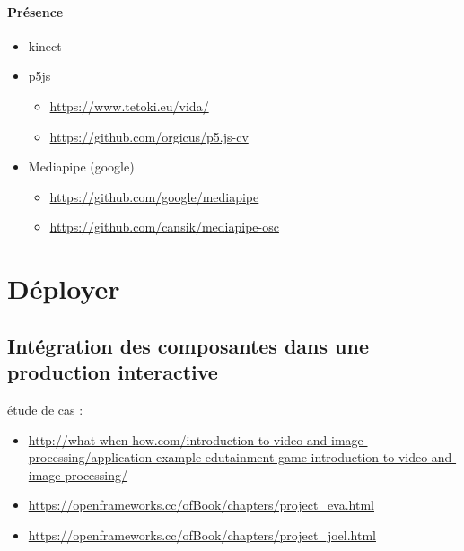 \documentclass[
  french,
]{book}
\providecommand{\tightlist}{%
  \setlength{\itemsep}{0pt}\setlength{\parskip}{0pt}}
\begin{document}
\hypertarget{interagir_presence}{%
\subsubsection{Présence}\label{interagir_presence}}

\begin{itemize}
\item
  kinect
\item
  p5js

  \begin{itemize}
  \tightlist
  \item
    \url{https://www.tetoki.eu/vida/}
  \item
    \url{https://github.com/orgicus/p5.js-cv}
  \end{itemize}
\item
  Mediapipe (google)

  \begin{itemize}
  \tightlist
  \item
    \url{https://github.com/google/mediapipe}
  \item
    \url{https://github.com/cansik/mediapipe-osc}
  \end{itemize}
\end{itemize}

\hypertarget{deployer}{%
\chapter{Déployer}\label{deployer}}

\hypertarget{intuxe9gration-des-composantes-dans-une-production-interactive}{%
\section{Intégration des composantes dans une production interactive}\label{intuxe9gration-des-composantes-dans-une-production-interactive}}

étude de cas :

\begin{itemize}
\item
  \url{http://what-when-how.com/introduction-to-video-and-image-processing/application-example-edutainment-game-introduction-to-video-and-image-processing/}
\item
  \url{https://openframeworks.cc/ofBook/chapters/project_eva.html}
\item
  \url{https://openframeworks.cc/ofBook/chapters/project_joel.html}
\end{itemize}
\end{document}
